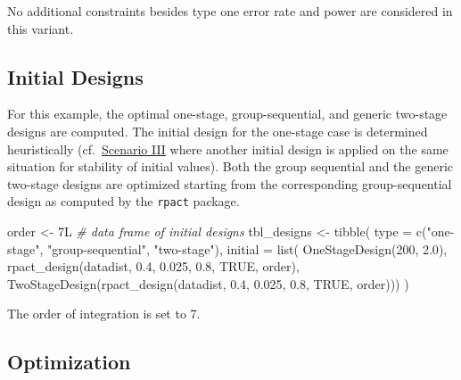 \documentclass[
]{book}
\newenvironment{Shaded}{\begin{snugshade}}{\end{snugshade}}
\newcommand{\AttributeTok}[1]{\textcolor[rgb]{0.77,0.63,0.00}{#1}}
\newcommand{\CommentTok}[1]{\textcolor[rgb]{0.56,0.35,0.01}{\textit{#1}}}
\newcommand{\ConstantTok}[1]{\textcolor[rgb]{0.00,0.00,0.00}{#1}}
\newcommand{\DecValTok}[1]{\textcolor[rgb]{0.00,0.00,0.81}{#1}}
\newcommand{\FloatTok}[1]{\textcolor[rgb]{0.00,0.00,0.81}{#1}}
\newcommand{\FunctionTok}[1]{\textcolor[rgb]{0.00,0.00,0.00}{#1}}
\newcommand{\NormalTok}[1]{#1}
\newcommand{\OtherTok}[1]{\textcolor[rgb]{0.56,0.35,0.01}{#1}}
\newcommand{\StringTok}[1]{\textcolor[rgb]{0.31,0.60,0.02}{#1}}
\begin{document}
No additional constraints besides type one error rate and power
are considered in this variant.

\hypertarget{initial-designs}{%
\subsection{Initial Designs}\label{initial-designs}}

For this example, the optimal one-stage, group-sequential, and generic
two-stage designs are computed.
The initial design for the one-stage case is determined heuristically
(cf.~\protect\hyperlink{scenarioIII}{Scenario III} where another initial design is applied
on the same situation for stability of initial values).
Both the group sequential and the generic two-stage designs are
optimized starting from the corresponding group-sequential design as
computed by the \texttt{rpact} package.

\begin{Shaded}
\begin{Highlighting}[]
\NormalTok{order }\OtherTok{\textless{}{-}}\NormalTok{ 7L}
\CommentTok{\# data frame of initial designs }
\NormalTok{tbl\_designs }\OtherTok{\textless{}{-}} \FunctionTok{tibble}\NormalTok{(}
    \AttributeTok{type    =} \FunctionTok{c}\NormalTok{(}\StringTok{"one{-}stage"}\NormalTok{, }\StringTok{"group{-}sequential"}\NormalTok{, }\StringTok{"two{-}stage"}\NormalTok{),}
    \AttributeTok{initial =} \FunctionTok{list}\NormalTok{(}
        \FunctionTok{OneStageDesign}\NormalTok{(}\DecValTok{200}\NormalTok{, }\FloatTok{2.0}\NormalTok{),}
        \FunctionTok{rpact\_design}\NormalTok{(datadist, }\FloatTok{0.4}\NormalTok{, }\FloatTok{0.025}\NormalTok{, }\FloatTok{0.8}\NormalTok{, }\ConstantTok{TRUE}\NormalTok{, order),}
        \FunctionTok{TwoStageDesign}\NormalTok{(}\FunctionTok{rpact\_design}\NormalTok{(datadist, }\FloatTok{0.4}\NormalTok{, }\FloatTok{0.025}\NormalTok{, }\FloatTok{0.8}\NormalTok{, }\ConstantTok{TRUE}\NormalTok{, order))) )}
\end{Highlighting}
\end{Shaded}

The order of integration is set to 7.

\hypertarget{optimization}{%
\subsection{Optimization}\label{optimization}}
\end{document}
